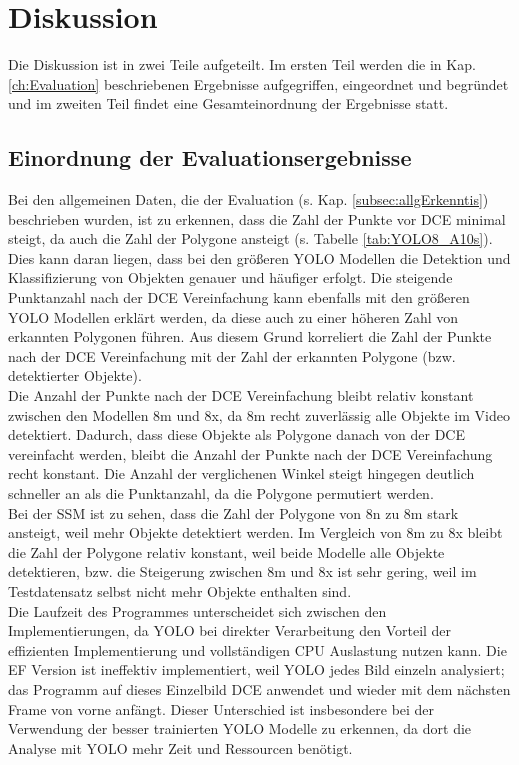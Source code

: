 \chapter{Diskussion}
\label{ch:Diskussion}
{ 
	Die Diskussion ist in zwei Teile aufgeteilt. Im ersten Teil werden die in Kap. \ref{ch:Evaluation} beschriebenen Ergebnisse aufgegriffen, eingeordnet und begründet und im zweiten Teil findet eine Gesamteinordnung der Ergebnisse statt.

	\section{Einordnung der Evaluationsergebnisse}
	{
		Bei den allgemeinen Daten, die der Evaluation (s. Kap. \ref{subsec:allgErkenntis}) beschrieben wurden, ist zu erkennen, dass die Zahl der Punkte vor DCE minimal steigt, da auch die Zahl der Polygone ansteigt (s. Tabelle \ref{tab:YOLO8_A10s}). Dies kann daran liegen, dass bei den größeren YOLO Modellen die Detektion und Klassifizierung von Objekten genauer und häufiger erfolgt. Die steigende Punktanzahl nach der DCE Vereinfachung kann ebenfalls mit den größeren YOLO Modellen erklärt werden, da diese auch zu einer höheren Zahl von erkannten Polygonen führen. Aus diesem Grund korreliert die Zahl der Punkte nach der DCE Vereinfachung mit der Zahl der erkannten Polygone (bzw. detektierter Objekte).\\
		Die Anzahl der Punkte nach der DCE Vereinfachung bleibt relativ konstant zwischen den Modellen 8m und 8x, da 8m recht zuverlässig alle Objekte im Video detektiert. Dadurch, dass diese Objekte als Polygone danach von der DCE vereinfacht werden, bleibt die Anzahl der Punkte nach der DCE Vereinfachung recht konstant. Die Anzahl der verglichenen Winkel steigt hingegen deutlich schneller an als die Punktanzahl, da die Polygone permutiert werden. \\
		Bei der SSM ist zu sehen, dass die Zahl der Polygone von 8n zu 8m stark ansteigt, weil mehr Objekte detektiert werden. Im Vergleich von 8m zu 8x bleibt die Zahl der Polygone relativ  konstant, weil beide Modelle alle Objekte detektieren, bzw. die Steigerung zwischen 8m und 8x ist sehr gering, weil im Testdatensatz selbst nicht mehr Objekte enthalten sind. \\
		Die Laufzeit des Programmes unterscheidet sich zwischen den Implementierungen, da YOLO bei direkter Verarbeitung den Vorteil der effizienten Implementierung und vollständigen CPU Auslastung nutzen kann. Die EF Version ist ineffektiv implementiert, weil YOLO jedes Bild einzeln analysiert; das Programm auf dieses Einzelbild DCE anwendet und wieder mit dem nächsten Frame von vorne anfängt. Dieser Unterschied ist insbesondere bei der Verwendung der besser trainierten YOLO Modelle zu erkennen, da dort die Analyse mit YOLO mehr Zeit und Ressourcen benötigt. \\
}}
